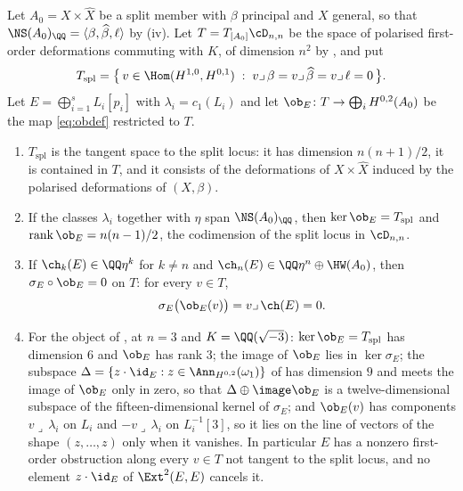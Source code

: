 \begin{proposition}
\label{prop:splitobstruction}
Let $A_{0}=X\times\widehat X$ be a split member with $\beta$ principal and
$X$ general, so that $\NS(A_{0})_{\QQ}=\langle\beta,\widehat\beta,\ell\rangle$
by (iv). Let $T=T_{[A_{0}]}\cD_{n,n}$ be the space of
polarised first-order deformations commuting with $K$, of dimension $n^{2}$
by , and put
\[
  T_{\mathrm{spl}}
  =\bigl\{\,v\in\Hom(H^{1,0},H^{0,1})\;:\;
    v\lrcorner\,\beta=v\lrcorner\,\widehat\beta=v\lrcorner\,\ell=0\,\bigr\}.
\]
Let $E=\bigoplus_{i=1}^{s}L_{i}[p_{i}]$ with $\lambda_{i}=c_{1}(L_{i})$ and
let $\ob_{E}\colon T\to\bigoplus_{i}H^{0,2}(A_{0})$ be the map
\eqref{eq:obdef} restricted to $T$.
\begin{enumerate}[label=\textup{(\roman*)},nosep]
\item $T_{\mathrm{spl}}$ is the tangent space to the split locus: it has
  dimension $n(n+1)/2$, it is contained in $T$, and it consists of the
  deformations of $X\times\widehat X$ induced by the polarised deformations
  of $(X,\beta)$.
\item If the classes $\lambda_{i}$ together with $\eta$ span
  $\NS(A_{0})_{\QQ}$, then $\ker\ob_{E}=T_{\mathrm{spl}}$ and
  $\operatorname{rank}\ob_{E}=n(n-1)/2$, the codimension of the split locus
  in $\cD_{n,n}$.
\item If $\ch_{k}(E)\in\QQ\eta^{k}$ for $k\ne n$ and
  $\ch_{n}(E)\in\QQ\eta^{n}\oplus\HW(A_{0})$, then
  $\sigma_{E}\circ\ob_{E}=0$ on $T$: for every $v\in T$,
  \begin{equation}\label{eq:sigmaob}
    \sigma_{E}\bigl(\ob_{E}(v)\bigr)=v\lrcorner\,\ch(E)=0 .
  \end{equation}
\item For the object of , at $n=3$ and
  $K=\QQ(\sqrt{-3})$: $\ker\ob_{E}=T_{\mathrm{spl}}$ has dimension $6$ and
  $\ob_{E}$ has rank $3$; the image of $\ob_{E}$ lies in $\ker\sigma_{E}$;
  the subspace $\Delta=\{z\cdot\id_{E}:z\in\Ann_{H^{0,2}}(\omega_{1})\}$ of
   has dimension $9$ and meets the image of $\ob_{E}$
  only in zero, so that $\Delta\oplus\image\ob_{E}$ is a twelve-dimensional
  subspace of the fifteen-dimensional kernel of $\sigma_{E}$; and
  $\ob_{E}(v)$ has components $v\lrcorner\,\lambda_{i}$ on $L_{i}$ and
  $-v\lrcorner\,\lambda_{i}$ on $L_{i}^{-1}[3]$, so it lies on the line of
  vectors of the shape $(z,\dots,z)$ only when it vanishes. In particular
  $E$ has a nonzero first-order obstruction along every $v\in T$ not tangent
  to the split locus, and no element $z\cdot\id_{E}$ of $\Ext^{2}(E,E)$
  cancels it.
\end{enumerate}
\end{proposition}

